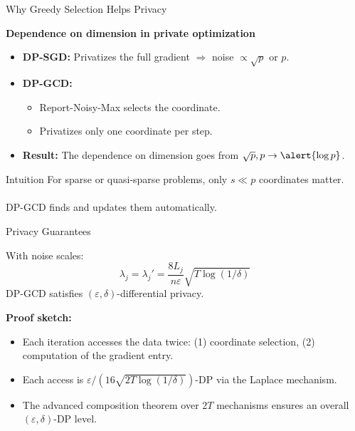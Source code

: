 \documentclass[10pt]{beamer}
\begin{document}
\begin{frame}{Why Greedy Selection Helps Privacy}

\textbf{Dependence on dimension in private optimization}

\begin{itemize}

\item \textbf{DP-SGD:} Privatizes the full gradient $\Rightarrow$ noise $ \propto \sqrt{p}$ or $p$.

\item \textbf{DP-GCD:}
\begin{itemize}
    \item Report-Noisy-Max selects the coordinate.
    \item Privatizes \alert{only one coordinate per step}.
\end{itemize}

\item \textbf{Result:} The dependence on dimension goes from $\sqrt{p}, p \rightarrow \alert{\log p}$.

\end{itemize}

\vspace{1em}
\begin{block}{Intuition}
For sparse or quasi-sparse problems, only $s \ll p$ coordinates matter.\\\\
DP-GCD finds and updates them automatically.
\end{block}

\end{frame}

\begin{frame}{Privacy Guarantees}
\begin{theorem}
With noise scales:
\[
\lambda_j = \lambda_j' = \frac{8L_j}{n\varepsilon} \sqrt{T \log(1/\delta)}
\]
DP-GCD satisfies $(\varepsilon, \delta)$-differential privacy.
\end{theorem}

\vspace{1em}
\textbf{Proof sketch:}
\begin{itemize}
\item Each iteration accesses the data twice: (1) coordinate selection, (2) computation of the gradient entry.
\item Each access is $\varepsilon/(16\sqrt{2T\log(1/\delta)})$-DP via the Laplace mechanism.
\item The advanced composition theorem over $2T$ mechanisms ensures an overall $(\varepsilon, \delta)$-DP level.
\end{itemize}

\end{frame}
\end{document}
